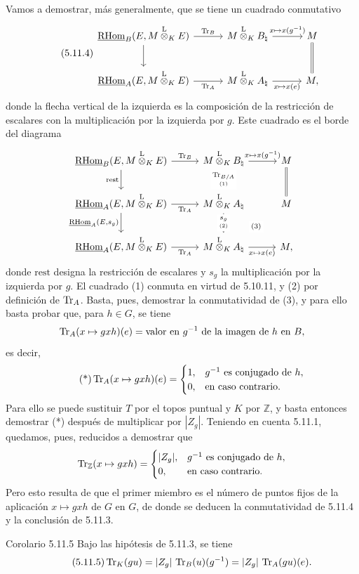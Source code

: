 Vamos a demostrar, más generalmente, que se tiene un cuadrado conmutativo
\begin{equation}\tag{5.11.4}
\begin{tikzcd}[column sep=3.0em,row sep=2.2em]
\uRHom_B(E,M\lten_KE) \arrow[r,"\Tr_B"] \arrow[d] &
M\lten_KB_\natural \arrow[r,"{x\mapsto x(g^{-1})}"] &
M \arrow[d,equal] \\
\uRHom_A(E,M\lten_KE) \arrow[r,"\Tr_A"'] &
M\lten_KA_\natural \arrow[r,"{x\mapsto x(e)}"'] &
M,
\end{tikzcd}
\end{equation}
donde la flecha vertical de la izquierda es la composición de la restricción de escalares con la multiplicación por la izquierda por $g$. Este cuadrado es el borde del diagrama
\[
\begin{tikzcd}[column sep=2.8em,row sep=2.0em]
\uRHom_B(E,M\lten_KE) \arrow[r,"\Tr_B"] \arrow[d,"\mathrm{rest}"'] &
M\lten_KB_\natural \arrow[r,"{x\mapsto x(g^{-1})}"] \arrow[d,"{\underset{(1)}{\Tr_{B/A}}}" description] &
M \arrow[d,equal] \\
\uRHom_A(E,M\lten_KE) \arrow[r,"\Tr_A"'] \arrow[d,"{\uRHom_A(E,s_g)}"'] &
M\lten_KA_\natural \arrow[d,"{\underset{(2)}{s_g}}" description] \arrow[dr,phantom,"\scriptstyle(3)" description] &
M \\
\uRHom_A(E,M\lten_KE) \arrow[r,"\Tr_A"'] &
M\lten_KA_\natural \arrow[r,"{x\mapsto x(e)}"'] &
M,
\end{tikzcd}
\]
donde $\mathrm{rest}$ designa la restricción de escalares y $s_g$ la multiplicación por la izquierda por $g$. El cuadrado (1) conmuta en virtud de 5.10.11, y (2) por definición de $\operatorname{Tr}_A$. Basta, pues, demostrar la conmutatividad de (3), y para ello basta probar que, para $h\in G$, se tiene
\[
\operatorname{Tr}_A(x\mapsto gxh)(e)=\text{valor en }g^{-1}\text{ de la imagen de }h\text{ en }B,
\]
es decir,
\begin{equation}\tag{*}
\operatorname{Tr}_A(x\mapsto gxh)(e)=
\begin{cases}
1,& g^{-1}\text{ es conjugado de }h,\\
0,& \text{en caso contrario}.
\end{cases}
\end{equation}
Para ello se puede sustituir $T$ por el topos puntual y $K$ por $\mathbb Z$, y basta entonces demostrar (*) después de multiplicar por $|Z_g|$. Teniendo en cuenta 5.11.1, quedamos, pues, reducidos a demostrar que
\[
\operatorname{Tr}_{\mathbb Z}(x\mapsto gxh)=
\begin{cases}
|Z_g|,& g^{-1}\text{ es conjugado de }h,\\
0,& \text{en caso contrario}.
\end{cases}
\]
Pero esto resulta de que el primer miembro es el número de puntos fijos de la aplicación $x\mapsto gxh$ de $G$ en $G$, de donde se deducen la conmutatividad de 5.11.4 y la conclusión de 5.11.3.

\begin{statement}{Corolario 5.11.5}
Bajo las hipótesis de 5.11.3, se tiene
\begin{equation}\tag{5.11.5}
\operatorname{Tr}_K(gu)=|Z_g|\,\operatorname{Tr}_B(u)(g^{-1})=|Z_g|\,\operatorname{Tr}_A(gu)(e).
\end{equation}
\end{statement}
